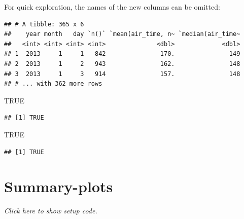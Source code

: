 \documentclass[]{book}
\newenvironment{Shaded}{}{}
\newcommand{\DataTypeTok}[1]{#1}
\newcommand{\KeywordTok}[1]{\textcolor[rgb]{0.00,0.00,1.00}{#1}}
\newcommand{\NormalTok}[1]{#1}
\newcommand{\OperatorTok}[1]{#1}
\newcommand{\OtherTok}[1]{\textcolor[rgb]{1.00,0.25,0.00}{#1}}
\newcommand{\StringTok}[1]{\textcolor[rgb]{0.00,0.50,0.50}{#1}}
\begin{document}
For quick exploration, the names of the new columns can be omitted:

\begin{Shaded}
\end{Shaded}

\begin{verbatim}
## # A tibble: 365 x 6
##    year month   day `n()` `mean(air_time, n~ `median(air_time~
##   <int> <int> <int> <int>              <dbl>             <dbl>
## 1  2013     1     1   842               170.               149
## 2  2013     1     2   943               162.               148
## 3  2013     1     3   914               157.               148
## # ... with 362 more rows
\end{verbatim}

\begin{Shaded}
\begin{Highlighting}[]
\OtherTok{TRUE}
\end{Highlighting}
\end{Shaded}

\begin{verbatim}
## [1] TRUE
\end{verbatim}

\begin{Shaded}
\begin{Highlighting}[]
\OtherTok{TRUE}
\end{Highlighting}
\end{Shaded}

\begin{verbatim}
## [1] TRUE
\end{verbatim}

\hypertarget{summary-plots}{%
\section{Summary-plots}\label{summary-plots}}

\emph{Click here to show setup code.}
\end{document}
